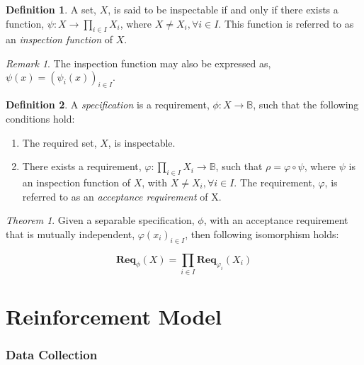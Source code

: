 \documentclass{article}
\theoremstyle{definition}
\newtheorem{definition}{Definition}[section]
\theoremstyle{remark}
\newtheorem*{remark}{Remark}
\newtheorem*{theorem}{Theorem}
\newcommand{\func}[3]{#1:#2\rightarrow#3}
\newcommand{\reqfunc}[2]{#1:#2\rightarrow\mathbb{B}}
\newcommand{\reqop}[2]{\mathbf{Req}_{#1}(#2)}
\begin{document}
	
		\begin{definition}
			A set, $X$, is said to be inspectable if and only if there exists a function,
			$\func{\psi}{X}{\prod_{i \in I}{X_{i}}}$, where $X \ne X_{i}, \forall i \in I$. This function is referred to as an
			\emph{inspection function} of $X$.
		\end{definition}
		
		\begin{remark}
			The inspection function may also be expressed as, $\psi(x) = (\psi_{i}(x))_{i \in I}.$
		\end{remark}
		
		\begin{definition}
			A \emph{specification} is a requirement, $\reqfunc{\phi}{X}$, such that the following conditions
			hold:
			
			\begin{enumerate}
				\item The required set, $X$, is inspectable.
				
				\item There exists a requirement, $\reqfunc{\varphi}{\prod_{i \in I}{X_{i}}}$,
				such that $\rho = \varphi \circ \psi$, where $\psi$ is an inspection function of $X$,
				with $X \ne X_{i}, \forall i \in I$. The requirement, $\varphi$, is referred to as an
				\emph{acceptance requirement} of X.
			\end{enumerate}
			
		\end{definition}
		
		\begin{theorem}
			Given a separable specification, $\phi$, with an acceptance requirement that is mutually independent,
			$\varphi(x_i)_{i \in I}$, then following isomorphism holds:
			
			\[
			\reqop{\phi}{X} = \prod_{i \in I}\reqop{\varphi_{i}}{X_{i}}
			\]
		\end{theorem}
	\fi
	
	\newpage
	
\part{Reinforcement Model}

	\section{Data Collection}
\end{document}
